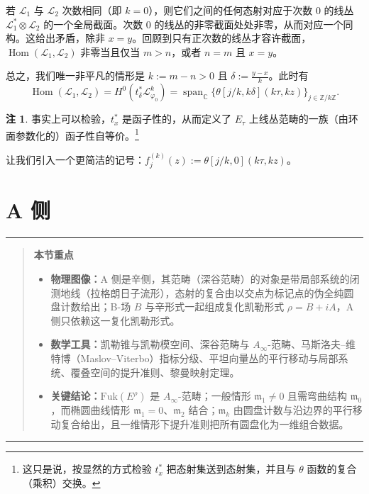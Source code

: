\documentclass[11pt,a4paper]{article}
\theoremstyle{plain}
\theoremstyle{definition}
\newtheorem{remark}[theorem]{注}
\newenvironment{keytakeaways}[1][本节重点]{%
  \par\addvspace{9pt}%
  \noindent\rule{\linewidth}{0.7pt}\par\nobreak
  \begin{quote}\noindent\textbf{#1}\par\small
}{%
  \end{quote}%
  \noindent\rule{\linewidth}{0.7pt}\par\addvspace{7pt}%
}
\begin{document}
若 $\mathcal{L}_1$ 与 $\mathcal{L}_2$ 次数相同（即 $k=0$），则它们之间的任何态射对应于次数 $0$ 的线丛 $\mathcal{L}_1^*\otimes\mathcal{L}_2$ 的一个全局截面。次数 $0$ 的线丛的非零截面处处非零，从而对应一个同构。这给出矛盾，除非 $x=y$。回顾到只有正次数的线丛才容许截面，$\operatorname{Hom}(\mathcal{L}_1,\mathcal{L}_2)$ 非零当且仅当 $m>n$，或者 $n=m$ 且 $x=y$。

总之，我们唯一非平凡的情形是 $k:=m-n>0$ 且 $\delta:=\frac{y-x}{k}$。此时有
\[
\operatorname{Hom}(\mathcal{L}_1,\mathcal{L}_2)=H^0(t_\delta^*\mathcal{L}_{\varphi_0}^k)=\operatorname{span}_{\mathbb{C}}\{\theta[j/k,k\delta](k\tau,kz)\}_{j\in\mathbb{Z}/k\mathbb{Z}}.
\]

\begin{remark}
事实上可以检验，$t_x^*$ 是函子性的，从而定义了 $E_\tau$ 上线丛范畴的一族（由环面参数化的）函子性自等价。\footnote{这只是说，按显然的方式检验 $t_x^*$ 把态射集送到态射集，并且与 $\theta$ 函数的复合（乘积）交换。}
\end{remark}

让我们引入一个更简洁的记号：$f_j^{(k)}(z):=\theta[j/k,0](k\tau,kz)$。

\section{A 侧}

\begin{keytakeaways}
\begin{itemize}
  \item \textbf{物理图像：}A 侧是辛侧，其范畴（深谷范畴）的对象是带局部系统的闭测地线（拉格朗日子流形），态射的复合由以交点为标记点的伪全纯圆盘计数给出；B-场 $B$ 与辛形式一起组成复化凯勒形式 $\rho=B+iA$，A 侧只依赖这一复化凯勒形式。
  \item \textbf{数学工具：}凯勒锥与凯勒模空间、深谷范畴与 $A_\infty$-范畴、马斯洛夫–维特博（Maslov--Viterbo）指标分级、平坦向量丛的平行移动与局部系统、覆叠空间的提升准则、黎曼映射定理。
  \item \textbf{关键结论：}$\mathrm{Fuk}(E^\rho)$ 是 $A_\infty$-范畴；一般情形 $\mathfrak{m}_1\ne0$ 且需弯曲结构 $\mathfrak{m}_0$，而椭圆曲线情形 $\mathfrak{m}_1=0$、$\mathfrak{m}_2$ 结合；$\mathfrak{m}_k$ 由圆盘计数与沿边界的平行移动复合给出，且一维情形下提升准则把所有圆盘化为一维组合数据。
\end{itemize}
\end{keytakeaways}
\end{document}

